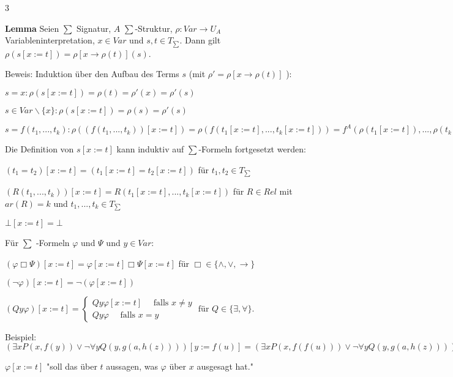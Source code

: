 \documentclass[a4paper]{article}
\renewcommand{\note}[2]{\begin{noteBox} \textbf{#1} #2 \end{noteBox}}
\begin{document}
\begin{multicols}{3}
  \note{Lemma}{Seien $\sum$ Signatur, $A$ $\sum$-Struktur, $\rho:Var\rightarrow U_A$ Variableninterpretation, $x\in Var$ und $s,t\in T_{\sum}$. Dann gilt $\rho(s[x:=t])=\rho[x\rightarrow \rho(t)](s)$.}

  Beweis: Induktion über den Aufbau des Terms $s$ (mit $\rho'=\rho[x\rightarrow \rho(t)]$ ):
  \begin{itemize*}
    \item $s=x:\rho(s[x:=t])=\rho(t) =\rho'(x) =\rho'(s)$
    \item $s\in Var\backslash\{x\}:\rho(s[x:=t])=\rho(s) =\rho'(s)$
    \item $s=f(t_1 ,...,t_k):\rho((f(t_1 ,...,t_k))[x:=t])= \rho(f(t_1[x:=t],...,t_k[x:=t]))= f^A(\rho(t_1[x:=t]),...,\rho(t_k[x:=t])) = f^A(\rho'(t_1),...,\rho'(t_k))= \rho'(f(t_1 ,...,t_k))=\rho'(s)$
  \end{itemize*}

  Die Definition von $s[x:=t]$ kann induktiv auf $\sum$-Formeln fortgesetzt werden:
  \begin{itemize*}
    \item $(t_1 =t_2 )[x:=t] = (t_1 [x:=t] =t_2 [x:=t])$ für $t_1 ,t_2 \in T_{\sum}$
    \item $(R(t_1 ,...,t_k))[x:=t] =R(t_1 [x:=t],...,t_k[x:=t])$ für $R\in Rel$ mit $ar(R) =k$ und $t_1 ,...,t_k\in T_{\sum}$
    \item $\bot[x:=t] =\bot$
  \end{itemize*}

  Für $\sum$ -Formeln $\varphi$ und $\Psi$ und $y\in Var$:
  \begin{itemize*}
    \item $(\varphi\Box\Psi)[x:=t]=\varphi [x:=t]\Box\Psi[x:=t]$ für $\Box\in\{\wedge,\vee,\rightarrow\}$
    \item $(\lnot\varphi)[x:=t] = \lnot(\varphi[x:=t])$
    \item $(Qy\varphi)[x:=t] = \begin{cases} Qy\varphi[x:=t] \quad\text{ falls } x\not=y \\ Qy\varphi \quad\text{ falls } x=y \end{cases} \text{ für } Q\in\{\exists,\forall\}$.
  \end{itemize*}

  Beispiel: $(\exists x P(x,f(y))\vee\lnot\forall yQ(y,g(a,h(z))))[y:=f(u)] = (\exists x P(x,f(f(u)))\vee\lnot\forall yQ(y,g(a,h(z))))$

  $\varphi [x:=t]$ "soll das über $t$ aussagen, was $\varphi$ über $x$ ausgesagt hat."


\end{multicols}
\end{document}
